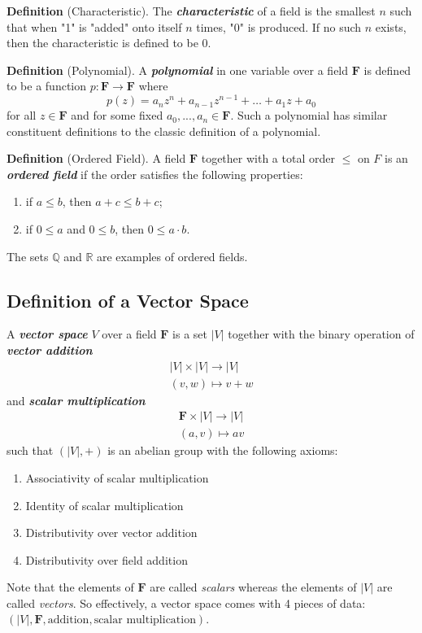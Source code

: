 \textbf{Definition} (Characteristic). The \textbf{\textit{characteristic}} of a field is the smallest $n$ such that when "1" is "added" onto itself $n$ times, "0" is produced. If no such $n$ exists, then the characteristic is defined to be 0.

\textbf{Definition} (Polynomial). A \textbf{\textit{polynomial}} in one variable over a field $\mathbf{F}$ is defined to be a function $p:\mathbf{F}\to\mathbf{F}$ where
\[
p(z)=a_nz^n+a_{n-1}z^{n-1}+\ldots+a_1z+a_0
\]
for all $z\in\mathbf{F}$ and for some fixed $a_0,...,a_n\in\mathbf{F}$. Such a polynomial has similar constituent definitions to the classic definition of a polynomial.

\textbf{Definition} (Ordered Field). A field $\mathbf{F}$ together with a total order $\leq$ on $F$ is an \textbf{\textit{ordered field}} if the order satisfies the following properties:
\begin{enumerate}
    \item if $a\leq b$, then $a+c\leq b+c$;
    \item if $0\leq a$ and $0\leq b$, then $0\leq a\cdot b$.
\end{enumerate}
The sets $\mathbb{Q}$ and $\mathbb{R}$ are examples of ordered fields.


\subsection{Definition of a Vector Space}
A \textbf{\textit{vector space}} $V$ over a field $\mathbf{F}$ is a set $|V|$ together with the binary operation of \textbf{\textit{vector addition}}
\begin{align*}
    |V|\times|V|\to|V| \\
    (v,w)\mapsto v + w
\end{align*}
and \textbf{\textit{scalar multiplication}}
\begin{align*}
    \mathbf{F}\times|V|\to|V| \\
    (a,v)\mapsto av
\end{align*}
such that $(|V|,+)$ is an abelian group with the following axioms:
\begin{enumerate}
    \item Associativity of scalar multiplication
    \item Identity of scalar multiplication
    \item Distributivity over vector addition
    \item Distributivity over field addition
\end{enumerate}
Note that the elements of $\mathbf{F}$ are called \textit{scalars} whereas the elements of $|V|$ are called \textit{vectors}. So effectively, a vector space comes with 4 pieces of data: $(|V|, \mathbf{F}, \text{addition}, \text{scalar multiplication})$.



\newpage %

\newpage

\newpage

